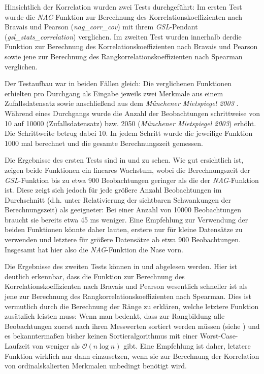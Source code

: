 Hinsichtlich der Korrelation wurden zwei Tests durchgeführt: Im ersten Test wurde die {\it NAG}-Funktion zur Berechnung des Korrelationskoeffizienten nach Bravais und Pearson ({\it nag\_corr\_cov}) mit ihrem {\it GSL}-Pendant ({\it gsl\_stats\_correlation}) verglichen. Im zweiten Test wurden innerhalb der\naglib die Funktion zur Berechnung des Korrelationskoeffizienten nach Bravais und Pearson sowie jene zur Berechnung des Rangkorrelationskoeffizienten nach Spearman verglichen.

Der Testaufbau war in beiden Fällen gleich: Die verglichenen Funktionen erhielten pro Durchgang als Eingabe jeweils zwei Merkmale aus einem Zufallsdatensatz sowie anschließend aus dem {\it Münchener Mietspiegel 2003} \cite{Fahrmeir2011}. Während eines Durchgangs wurde die Anzahl der Beobachtungen schrittweise von 10 auf 10000 (Zufallsdatensatz) bzw. 2050 ({\it Münchener Mietspiegel 2003}) erhöht. Die Schrittweite betrug dabei 10. In jedem Schritt wurde die jeweilige Funktion 1000 mal berechnet und die gesamte Berechnungszeit gemessen.

Die Ergebnisse des ersten Tests sind in  und  zu sehen. Wie gut ersichtlich ist, zeigen beide Funktionen ein lineares Wachstum, wobei die Berechnungszeit der {\it GSL}-Funktion bis zu etwa 900 Beobachtungen geringer als die der {\it NAG}-Funktion ist. Diese zeigt sich jedoch für jede größere Anzahl Beobachtungen im Durchschnitt (d.h. unter Relativierung der sichtbaren Schwankungen der Berechnungszeit) als geeigneter: Bei einer Anzahl von 10000 Beobachtungen braucht sie bereits etwa 45 ms weniger. Eine Empfehlung zur Verwendung der beiden Funktionen könnte daher lauten, erstere nur für kleine Datensätze zu verwenden und letztere für größere Datensätze ab etwa 900 Beobachtungen. Insgesamt hat hier also die {\it NAG}-Funktion die Nase vorn.

Die Ergebnisse des zweiten Tests können in  und  abgelesen werden. Hier ist deutlich erkennbar, dass die Funktion zur Berechnung des Korrelationskoeffizienten nach Bravais und Pearson wesentlich schneller ist als jene zur Berechnung des Rangkorrelationskoeffizienten nach Spearman. Dies ist vermutlich durch die Berechnung der Ränge zu erklären, welche letztere Funktion zusätzlich leisten muss: Wenn man bedenkt, dass zur Rangbildung alle Beobachtungen zuerst nach ihren Messwerten sortiert werden müssen (siehe ) und es bekanntermaßen bisher keinen Sortieralgorithmus mit einer Worst-Case-Laufzeit von weniger als $\mathcal{O}(n \log{n})$ gibt. Eine Empfehlung ist daher, letztere Funktion wirklich nur dann einzusetzen, wenn sie zur Berechnung der Korrelation von ordinalskalierten Merkmalen unbedingt benötigt wird.

